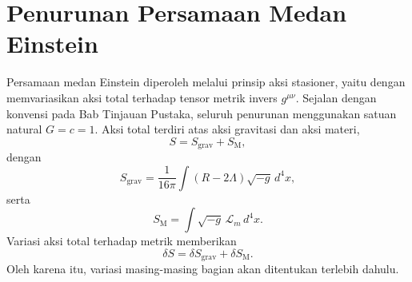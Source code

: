\chapter{Penurunan Persamaan Medan Einstein}
\label{app:penurunan-efe}
Persamaan medan Einstein diperoleh melalui prinsip aksi stasioner, yaitu dengan memvariasikan aksi total terhadap tensor metrik invers $g^{\mu\nu}$. Sejalan dengan konvensi pada Bab Tinjauan Pustaka, seluruh penurunan menggunakan satuan natural $G=c=1$. Aksi total terdiri atas aksi gravitasi dan aksi materi,
\begin{equation} S=S_{\mathrm{grav}}+S_{\mathrm{M}}, \end{equation}
dengan
\begin{equation} S_{\mathrm{grav}} = \frac{1}{16\pi} \int (R-2\Lambda)\sqrt{-g}\,d^4x, \label{eq:aksi-grav} \end{equation}
serta
\begin{equation} S_{\mathrm{M}} = \int \sqrt{-g}\, \mathcal{L}_m \,d^4x. \label{eq:aksi-materi} \end{equation}
Variasi aksi total terhadap metrik memberikan
\begin{equation} \delta S = \delta S_{\mathrm{grav}} + \delta S_{\mathrm{M}}. \end{equation}
Oleh karena itu, variasi masing-masing bagian akan ditentukan terlebih dahulu.

